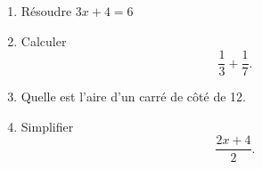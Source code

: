 
\begin{exercice}\label{exoPremiere-0064}

    \begin{multicols}{2}
    \begin{enumerate}
        \item
            Résoudre \( 3x+4=6\)
        \item
            Calculer
            \begin{equation}
                \frac{1}{ 3 }+\frac{1}{ 7 }.
            \end{equation}
        \item
            Quelle est l'aire d'un carré de côté de \unit{12}{\centi\meter\squared}.
        \item
            Simplifier
            \begin{equation}
                \frac{ 2x+4 }{ 2 }.
            \end{equation}
    \end{enumerate}
    \end{multicols}

\end{exercice}
